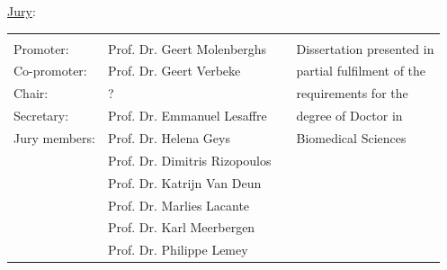 \begin{titlepage}
{\vspace{1.9cm}
\begin{minipage}{0.4\textwidth}                                                    %
\begin{flushleft}   \small                                                        %
\hspace{0.3cm}\underline{Jury}:
\begin{tabular}{llp{0.5cm}l}
                 \vspace{0.2cm}  & \vspace{0.2cm}  &&\\
                 \hspace{0.1cm} Promoter: & Prof. Dr. Geert Molenberghs&& Dissertation presented in  \\
                 \hspace{0.1cm} Co-promoter: & Prof. Dr. Geert Verbeke&&  partial fulfilment of the \\
                 \hspace{0.1cm} Chair: & ?&&  requirements for the \\
                 \hspace{0.1cm} Secretary: & Prof. Dr. Emmanuel Lesaffre&& degree of Doctor in \\
                 \hspace{0.1cm} Jury members: & Prof. Dr. Helena Geys&&  Biomedical Sciences\\
                                                & Prof. Dr. Dimitris Rizopoulos && \\
                                                &  Prof. Dr. Katrijn Van Deun  && \\
                                                &  Prof. Dr. Marlies Lacante  &&\\
                                                &  Prof. Dr. Karl Meerbergen  &&\\
                                                &  Prof. Dr. Philippe Lemey  &&
               \end{tabular}%
\end{flushleft}                                                                     %
\end{minipage}                                                   %

\vspace{1.7cm}
\begin{center}
\end{center}



}

\end{titlepage}
\clearpage
